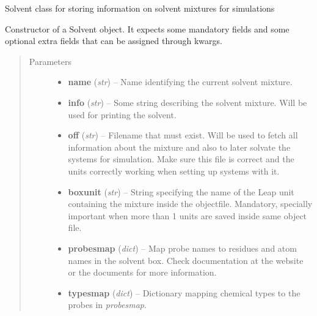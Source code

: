 \documentclass[letterpaper,10pt,english]{sphinxmanual}
\begin{document}
\begin{fulllineitems}
\label{solvents:pyMDMix.Solvents.Solvent}
Solvent class for storing information on solvent mixtures for simulations

\begin{fulllineitems}
\label{solvents:pyMDMix.Solvents.Solvent.__init__}
Constructor of a Solvent object.
It expects some mandatory fields and some optional extra fields that can be assigned through kwargs.
\begin{quote}\begin{description}
\item[{Parameters}] \leavevmode\begin{itemize}
\item {} 
\textbf{name} (\emph{str}) -- Name identifying the current solvent mixture.

\item {} 
\textbf{info} (\emph{str}) -- Some string describing the solvent mixture. Will be used for printing the solvent.

\item {} 
\textbf{off} (\emph{str}) -- Filename that must exist. Will be used to fetch all information about the mixture and
also to later solvate the systems for simulation. Make sure this file is correct and the units
correctly working when setting up systems with it.

\item {} 
\textbf{boxunit} (\emph{str}) -- String specifying the name of the Leap unit containing the mixture inside the objectfile. Mandatory, specially important when more than 1 units are saved inside same object file.

\item {} 
\textbf{probesmap} (\emph{dict}) -- Map probe names to residues and atom names in the solvent box. Check documentation at the website or the documents for more information.

\item {} 
\textbf{typesmap} (\emph{dict}) -- Dictionary mapping chemical types to the probes in \emph{probesmap}.


\end{itemize}
\end{description}
\end{quote}
\end{fulllineitems}
\end{fulllineitems}
\end{document}
